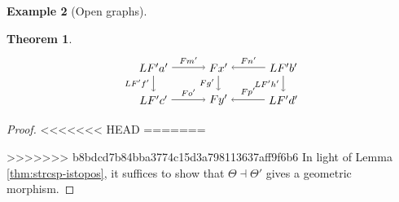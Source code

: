 \documentclass{amsart}
\newtheorem{theorem}{Theorem}[section]
\theoremstyle{remark}
\theoremstyle{definition}
\newtheorem{example}[theorem]{Example}
\begin{document}
\begin{example}[Open graphs]
\begin{theorem}
\[\begin{tikzpicture}
      \begin{scope}[shift={(6.5,0)}]
      \node (1) at (-2,1) {\( LF'a' \)};
      \node (2) at (0,1) {\( Fx' \)};
      \node (3) at (2,1) {\( LF'b' \)};
      \node (4) at (-2,0) {\( LF'c' \)};
      \node (5) at (0,0) {\( Fy' \)};
      \node (6) at (2,0) {\( LF'd' \)};
      \draw [->] (1) to node [above] {\scriptsize{\( Fm' \)}} (2);
      \draw [->] (3) to node [above] {\scriptsize{\( Fn' \)}} (2);
      \draw [->] (4) to node [above] {\scriptsize{\( Fo' \)}} (5);
      \draw [->] (6) to node [above] {\scriptsize{\( Fp' \)}} (5);
      \draw [->] (1) to node [left] {\scriptsize{\( LF'f' \)}} (4);
      \draw [->] (2) to node [left] {\scriptsize{\( Fg' \)}} (5);
      \draw [->] (3) to node [left] {\scriptsize{\( LF'h' \)}} (6);  
      \end{scope}
    \end{tikzpicture}
  \]  
\end{theorem}

\begin{proof}
<<<<<<< HEAD
=======

>>>>>>> b8bdcd7b84bba3774c15d3a798113637aff9f6b6
  In light of Lemma \ref{thm:strcsp-istopos}, it suffices to show that
  $ \Theta \dashv \Theta' $ gives a geometric morphism.


\end{proof}
\end{example}
\end{document}
